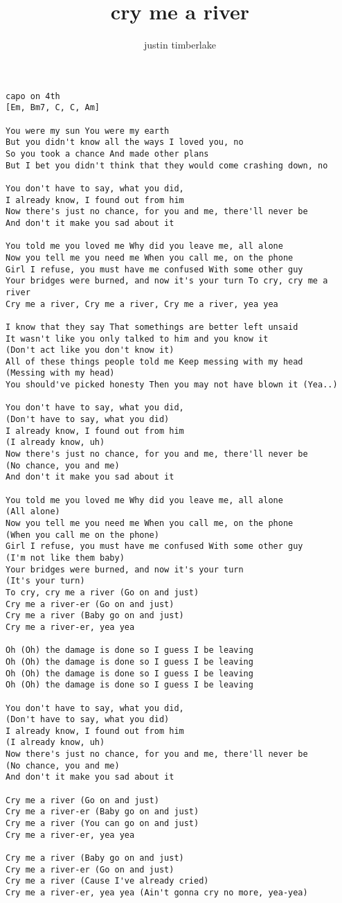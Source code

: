 \author{justin timberlake}
\title{cry me a river}
\maketitle
\begin{verbatim}
capo on 4th
[Em, Bm7, C, C, Am]

You were my sun You were my earth
But you didn't know all the ways I loved you, no
So you took a chance And made other plans
But I bet you didn't think that they would come crashing down, no

You don't have to say, what you did,
I already know, I found out from him
Now there's just no chance, for you and me, there'll never be
And don't it make you sad about it

You told me you loved me Why did you leave me, all alone
Now you tell me you need me When you call me, on the phone
Girl I refuse, you must have me confused With some other guy
Your bridges were burned, and now it's your turn To cry, cry me a river
Cry me a river, Cry me a river, Cry me a river, yea yea

I know that they say That somethings are better left unsaid
It wasn't like you only talked to him and you know it
(Don't act like you don't know it)
All of these things people told me Keep messing with my head
(Messing with my head)
You should've picked honesty Then you may not have blown it (Yea..)

You don't have to say, what you did,
(Don't have to say, what you did)
I already know, I found out from him
(I already know, uh)
Now there's just no chance, for you and me, there'll never be
(No chance, you and me)
And don't it make you sad about it

You told me you loved me Why did you leave me, all alone
(All alone)
Now you tell me you need me When you call me, on the phone
(When you call me on the phone)
Girl I refuse, you must have me confused With some other guy
(I'm not like them baby)
Your bridges were burned, and now it's your turn
(It's your turn)
To cry, cry me a river (Go on and just)
Cry me a river-er (Go on and just)
Cry me a river (Baby go on and just)
Cry me a river-er, yea yea

Oh (Oh) the damage is done so I guess I be leaving
Oh (Oh) the damage is done so I guess I be leaving
Oh (Oh) the damage is done so I guess I be leaving
Oh (Oh) the damage is done so I guess I be leaving

You don't have to say, what you did,
(Don't have to say, what you did)
I already know, I found out from him
(I already know, uh)
Now there's just no chance, for you and me, there'll never be
(No chance, you and me)
And don't it make you sad about it 

Cry me a river (Go on and just)
Cry me a river-er (Baby go on and just)
Cry me a river (You can go on and just)
Cry me a river-er, yea yea

Cry me a river (Baby go on and just)
Cry me a river-er (Go on and just)
Cry me a river (Cause I've already cried)
Cry me a river-er, yea yea (Ain't gonna cry no more, yea-yea)
\end{verbatim}